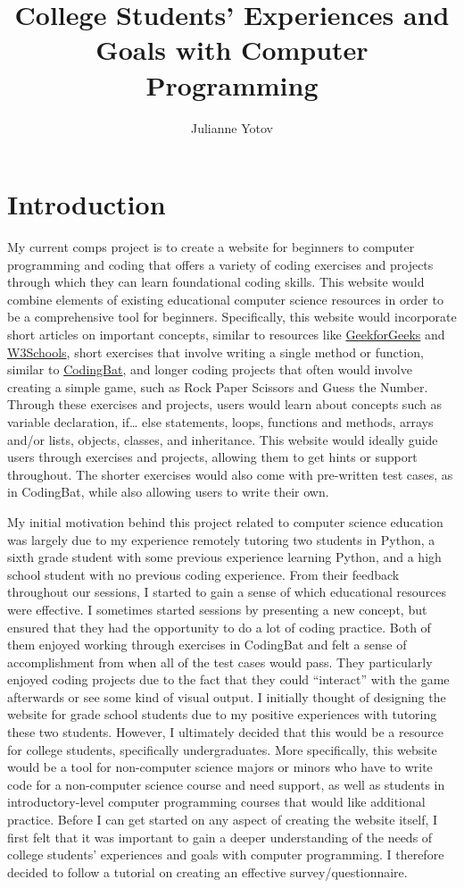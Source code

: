 \documentclass[10pt,twocolumn]{article}
\title{College Students' Experiences and Goals with Computer Programming}
\author{Julianne Yotov}
\affiliation{Occidental College}
\begin{document}
\maketitle

\section{Introduction}
My current comps project is to create a website for beginners to computer programming and coding that offers a variety of coding exercises and projects through which they can learn foundational coding skills. This website would combine elements of existing educational computer science resources in order to be a comprehensive tool for beginners. Specifically, this website would incorporate short articles on important concepts, similar to resources like \href{https://www.geeksforgeeks.org/}{GeekforGeeks} and \href{https://www.w3schools.com/}{W3Schools}, short exercises that involve writing a single method or function, similar to \href{https://codingbat.com/java}{CodingBat}, and longer coding projects that often would involve creating a simple game, such as Rock Paper Scissors and Guess the Number. Through these exercises and projects, users would learn about concepts such as variable declaration, if… else statements, loops, functions and methods, arrays and/or lists, objects, classes, and inheritance. This website would ideally guide users through exercises and projects, allowing them to get hints or support throughout. The shorter exercises would also come with pre-written test cases, as in CodingBat, while also allowing users to write their own. 

My initial motivation behind this project related to computer science education was largely due to my experience remotely tutoring two students in Python, a sixth grade student with some previous experience learning Python, and a high school student with no previous coding experience. From their feedback throughout our sessions, I started to gain a sense of which educational resources were effective. I sometimes started sessions by presenting a new concept, but ensured that they had the opportunity to do a lot of coding practice. Both of them enjoyed working through exercises in CodingBat and felt a sense of accomplishment from when all of the test cases would pass. They particularly enjoyed coding projects due to the fact that they could “interact” with the game afterwards or see some kind of visual output. I initially thought of designing the website for grade school students due to my positive experiences with tutoring these two students. However, I ultimately decided that this would be a resource for college students, specifically undergraduates. More specifically, this website would be a tool for non-computer science majors or minors who have to write code for a non-computer science course and need support, as well as students in introductory-level computer programming courses that would like additional practice. Before I can get started on any aspect of creating the website itself, I first felt that it was important to gain a deeper understanding of the needs of college students’ experiences and goals with computer programming. I therefore decided to follow a tutorial on creating an effective survey/questionnaire.
\end{document}
